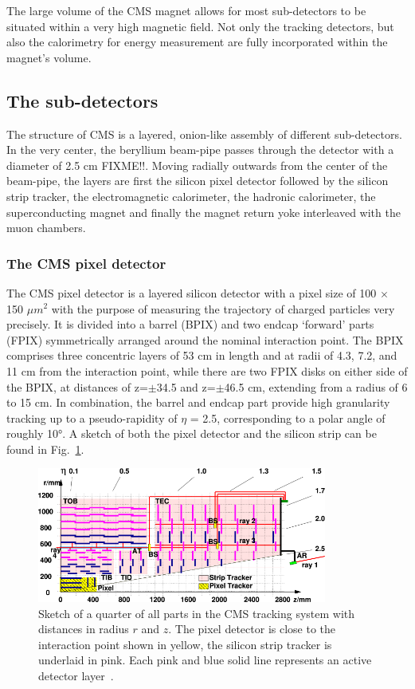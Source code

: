 The large volume of the CMS magnet allows for most sub-detectors to be situated within a very high magnetic field. Not only the
tracking detectors, but also the calorimetry for energy measurement are fully incorporated within the magnet's volume.



\subsection{The sub-detectors}
\label{sub:cms_subdet}
The structure of CMS is a layered, onion-like assembly of different sub-detectors. In the very center, the beryllium beam-pipe
passes through the detector with a diameter of 2.5 cm FIXME!!. Moving radially outwards from the center of the beam-pipe,
the layers are first the silicon pixel detector followed by the silicon strip tracker, the electromagnetic calorimeter,
the hadronic calorimeter, the superconducting magnet and finally the magnet return yoke interleaved with the muon chambers.

\subsubsection*{The CMS pixel detector}
The CMS pixel detector is a layered silicon detector with a pixel size of 100 $\times$ 150 $\mu m^2$ with the purpose of measuring the
trajectory of charged particles very precisely. It is divided into
a barrel (BPIX) and two endcap `forward' parts (FPIX) symmetrically arranged around the nominal interaction point. The BPIX comprises three
concentric layers of 53 cm in length and at radii of \num{4.3}, \num{7.2}, and \num{11} cm from the interaction point, while there are two FPIX 
disks on either side of the BPIX, at distances of z=$\pm$\num{34.5} and z=$\pm$\num{46.5} cm, extending from a radius of \num{6} to 15 cm.
In combination, the barrel and endcap part provide high granularity tracking up to a pseudo-rapidity of $\eta$ = 2.5, corresponding to a 
polar angle of roughly \ang{10}.
A sketch of both the pixel detector and the silicon strip can be found in Fig.~\ref{fig:tracker}.

\begin{figure}[h!]
    \centering
    \includegraphics[width=0.85\textwidth]{../figs/tracker.png}
    \caption{Sketch of a quarter of all parts in the CMS tracking system with distances in radius $r$ and $z$. The pixel detector is close to the
interaction point shown in yellow, the silicon strip tracker is underlaid in pink. Each pink and blue solid line represents an active
detector layer~\cite{cmstrackeralignment}.}
    \label{fig:tracker}
\end{figure}


